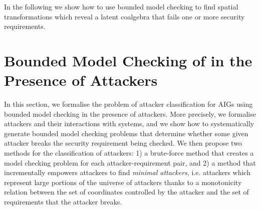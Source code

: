 In the following we show how to use bounded model checking to find spatial transformations which reveal a latent coalgebra that fails one or more security requirements. %

% 




\section{Bounded Model Checking of in the Presence of Attackers}
\label{sec:bmc}
In this section, we %
formalise the problem of attacker classification for AIGs using bounded model checking in the presence of attackers. More precisely, %
we formalise attackers and their interactions with systems, and we show how to systematically generate bounded model checking problems that determine whether some given attacker breaks the security requirement being checked. We then propose two methods for the classification of attackers: 1) a brute-force method that creates a model checking problem for each attacker-requirement pair, and 2) a method that incrementally empowers attackers to find \emph{minimal attackers}, i.e. attackers which represent large portions of the universe of attackers thanks to a monotonicity relation between the set of coordinates controlled by the attacker and the set of requirements that the attacker breaks. %

